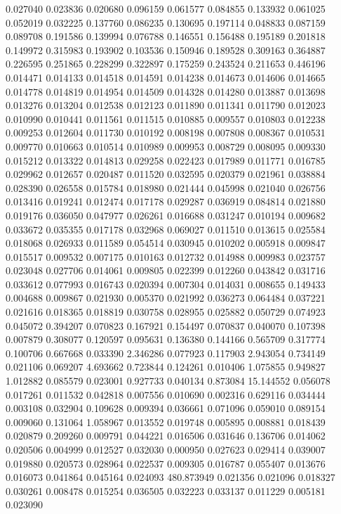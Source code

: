 0.027040
0.023836
0.020680
0.096159
0.061577
0.084855
0.133932
0.061025
0.052019
0.032225
0.137760
0.086235
0.130695
0.197114
0.048833
0.087159
0.089708
0.191586
0.139994
0.076788
0.146551
0.156488
0.195189
0.201818
0.149972
0.315983
0.193902
0.103536
0.150946
0.189528
0.309163
0.364887
0.226595
0.251865
0.228299
0.322897
0.175259
0.243524
0.211653
0.446196
0.014471
0.014133
0.014518
0.014591
0.014238
0.014673
0.014606
0.014665
0.014778
0.014819
0.014954
0.014509
0.014328
0.014280
0.013887
0.013698
0.013276
0.013204
0.012538
0.012123
0.011890
0.011341
0.011790
0.012023
0.010990
0.010441
0.011561
0.011515
0.010885
0.009557
0.010803
0.012238
0.009253
0.012604
0.011730
0.010192
0.008198
0.007808
0.008367
0.010531
0.009770
0.010663
0.010514
0.010989
0.009953
0.008729
0.008095
0.009330
0.015212
0.013322
0.014813
0.029258
0.022423
0.017989
0.011771
0.016785
0.029962
0.012657
0.020487
0.011520
0.032595
0.020379
0.021961
0.038884
0.028390
0.026558
0.015784
0.018980
0.021444
0.045998
0.021040
0.026756
0.013416
0.019241
0.012474
0.017178
0.029287
0.036919
0.084814
0.021880
0.019176
0.036050
0.047977
0.026261
0.016688
0.031247
0.010194
0.009682
0.033672
0.035355
0.017178
0.032968
0.069027
0.011510
0.013615
0.025584
0.018068
0.026933
0.011589
0.054514
0.030945
0.010202
0.005918
0.009847
0.015517
0.009532
0.007175
0.010163
0.012732
0.014988
0.009983
0.023757
0.023048
0.027706
0.014061
0.009805
0.022399
0.012260
0.043842
0.031716
0.033612
0.077993
0.016743
0.020394
0.007304
0.014031
0.008655
0.149433
0.004688
0.009867
0.021930
0.005370
0.021992
0.036273
0.064484
0.037221
0.021616
0.018365
0.018819
0.030758
0.028955
0.025882
0.050729
0.074923
0.045072
0.394207
0.070823
0.167921
0.154497
0.070837
0.040070
0.107398
0.007879
0.308077
0.120597
0.095631
0.136380
0.144166
0.565709
0.317774
0.100706
0.667668
0.033390
2.346286
0.077923
0.117903
2.943054
0.734149
0.021106
0.069207
4.693662
0.723844
0.124261
0.010406
1.075855
0.949827
1.012882
0.085579
0.023001
0.927733
0.040134
0.873084
15.144552
0.056078
0.017261
0.011532
0.042818
0.007556
0.010690
0.002316
0.629116
0.034444
0.003108
0.032904
0.109628
0.009394
0.036661
0.071096
0.059010
0.089154
0.009060
0.131064
1.058967
0.013552
0.019748
0.005895
0.008881
0.018439
0.020879
0.209260
0.009791
0.044221
0.016506
0.031646
0.136706
0.014062
0.020506
0.004999
0.012527
0.032030
0.000950
0.027623
0.029414
0.039007
0.019880
0.020573
0.028964
0.022537
0.009305
0.016787
0.055407
0.013676
0.016073
0.041864
0.045164
0.024093
480.873949
0.021356
0.021096
0.018327
0.030261
0.008478
0.015254
0.036505
0.032223
0.033137
0.011229
0.005181
0.023090

